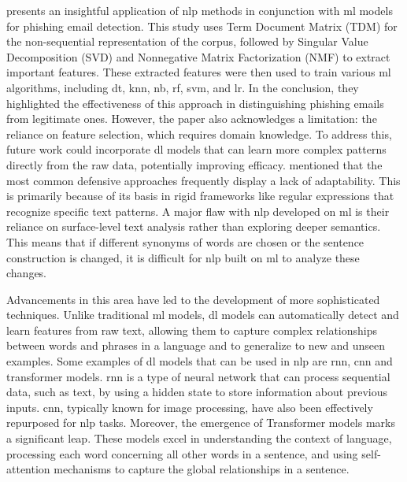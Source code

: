 \citet{Vazhayil201869} presents an insightful application of \ac{nlp} methods in conjunction with \ac{ml} models for phishing email detection. This study uses Term Document Matrix (TDM) for the non-sequential representation of the corpus, followed by Singular Value Decomposition (SVD) and Nonnegative Matrix Factorization (NMF) to extract important features. These extracted features were then used to train various \ac{ml} algorithms, including \ac{dt}, \ac{knn}, \ac{nb}, \ac{rf}, \ac{svm}, and \ac{lr}. In the conclusion, they highlighted the effectiveness of this approach in distinguishing phishing emails from legitimate ones. However, the paper also acknowledges a limitation: the reliance on feature selection, which requires domain knowledge. To address this, future work could incorporate \ac{dl} models that can learn more complex patterns directly from the raw data, potentially improving efficacy. \citet{Gutierrez2018988} mentioned that the most common defensive approaches frequently display a lack of adaptability. This is primarily because of its basis in rigid frameworks like regular expressions that recognize specific text patterns. A major flaw with \ac{nlp} developed on \ac{ml} is their reliance on surface-level text analysis rather than exploring deeper semantics. This means that if different synonyms of words are chosen or the sentence construction is changed, it is difficult for \ac{nlp} built on \ac{ml} to analyze these changes.

Advancements in this area have led to the development of more sophisticated techniques. Unlike traditional \ac{ml} models, \ac{dl} models can automatically detect and learn features from raw text, allowing them to capture complex relationships between words and phrases in a language and to generalize to new and unseen examples. Some examples of \ac{dl} models that can be used in \ac{nlp} are \ac{rnn}, \ac{cnn} and transformer models. \ac{rnn} is a type of neural network that can process sequential data, such as text, by using a hidden state to store information about previous inputs. \ac{cnn}, typically known for image processing, have also been effectively repurposed for \ac{nlp} tasks. Moreover, the emergence of Transformer models marks a significant leap. These models excel in understanding the context of language, processing each word concerning all other words in a sentence, and using self-attention mechanisms to capture the global relationships in a sentence.


